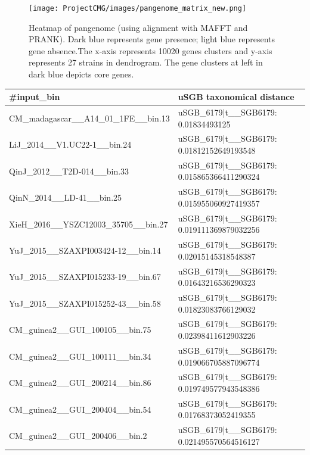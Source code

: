 \documentclass[11pt]{article}
\begin{document}
\begin{figure}[h!]
    \centering
    \texttt{[image: ProjectCMG/images/pangenome\_matrix\_new.png]}
    \caption{Heatmap of pangenome (using alignment with MAFFT and PRANK). Dark blue represents gene presence; light blue represents gene absence.The x-axis represents 10020 genes clusters and y-axis represents 27 strains in dendrogram. The gene clusters at left in dark blue depicts core genes.}
    \label{fig:roary2_matrix}
\end{figure}

\begin{landscape}
\begin{table}[!ht]
    \centering
    \begin{tabular}{|l|l|}
    \hline
        \#input\_bin & uSGB taxonomical distance \\ \hline
        CM\_madagascar\_\_A14\_01\_1FE\_\_bin.13 & uSGB\_6179|t\_\_SGB6179: 0.01834493125 \\ \hline
        LiJ\_2014\_\_V1.UC22-1\_\_bin.24 & uSGB\_6179|t\_\_SGB6179: 0.01812152649193548 \\ \hline
        QinJ\_2012\_\_T2D-014\_\_bin.33 & uSGB\_6179|t\_\_SGB6179: 0.015865366411290324 \\ \hline
        QinN\_2014\_\_LD-41\_\_bin.25 & uSGB\_6179|t\_\_SGB6179: 0.015955060927419357 \\ \hline
        XieH\_2016\_\_YSZC12003\_35705\_\_bin.27 & uSGB\_6179|t\_\_SGB6179: 0.019111369879032256 \\ \hline
        YuJ\_2015\_\_SZAXPI003424-12\_\_bin.14 & uSGB\_6179|t\_\_SGB6179: 0.02015145318548387 \\ \hline
        YuJ\_2015\_\_SZAXPI015233-19\_\_bin.67 & uSGB\_6179|t\_\_SGB6179: 0.01643216536290323 \\ \hline
        YuJ\_2015\_\_SZAXPI015252-43\_\_bin.58 & uSGB\_6179|t\_\_SGB6179: 0.01823083766129032 \\ \hline
        CM\_guinea2\_\_GUI\_100105\_\_bin.75 & uSGB\_6179|t\_\_SGB6179: 0.02398411612903226 \\ \hline
        CM\_guinea2\_\_GUI\_100111\_\_bin.34 & uSGB\_6179|t\_\_SGB6179: 0.019066705887096774 \\ \hline
        CM\_guinea2\_\_GUI\_200214\_\_bin.86 & uSGB\_6179|t\_\_SGB6179: 0.019749577943548386 \\ \hline
        CM\_guinea2\_\_GUI\_200404\_\_bin.54 & uSGB\_6179|t\_\_SGB6179: 0.01768373052419355 \\ \hline
        CM\_guinea2\_\_GUI\_200406\_\_bin.2 & uSGB\_6179|t\_\_SGB6179: 0.021495570564516127 \\ \hline

\end{tabular}
\end{table}
\end{landscape}
\end{document}

